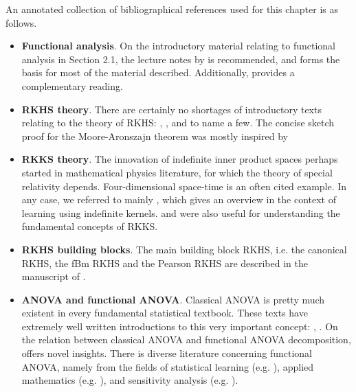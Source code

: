 \documentclass[a4paper,showframe,11pt]{report}
\begin{document}
An annotated collection of bibliographical references used for this chapter is as follows.
\begin{itemize}
  \item \textbf{Functional analysis}. On the introductory material relating to functional analysis in Section 2.1, the lecture notes by \citet{sejdinovic2012} is recommended, and forms the basis for most of the material described. Additionally, \citet{rudin1987real} provides a complementary reading.
  \item \textbf{RKHS theory}. There are certainly no shortages of introductory texts relating to the theory of RKHS: \citet{steinwart2008support}, \citet{berlinet2011reproducing}, and \citet{gu2013smoothing} to name a few. The concise sketch proof for the Moore-Aronszajn theorem was mostly inspired by \citet[Theorem 4]{hein2004kernels}
  \item \textbf{RKKS theory}. The innovation of indefinite inner product spaces perhaps started in mathematical physics literature, for which the theory of special relativity depends. Four-dimensional space-time is an often cited example. In any case, we referred to mainly \citet{ong2004learning}, which gives an overview in the context of learning using indefinite kernels. \citet{alpay1991some} and \citet{zafeiriou2012subspace} were also useful for understanding the fundamental concepts of RKKS.
  \item \textbf{RKHS building blocks}. The main building block RKHS, i.e. the canonical RKHS, the fBm RKHS and the Pearson RKHS are described in the manuscript of \citet{bergsma2017}.
  \item \textbf{ANOVA and functional ANOVA}. 
  Classical ANOVA is pretty much existent in every fundamental statistical textbook. These texts have extremely well written introductions to this very important concept: \citet[Ch. 11]{casella2002statistical}, \citet[Ch. 3]{dean1999design}. 
  On the relation between classical ANOVA and functional ANOVA decomposition, \citet{gu2013smoothing} offers novel insights. There is diverse literature concerning functional ANOVA, namely from the fields of statistical learning (e.g. \cite{wahba1990spline}), applied mathematics (e.g. \cite{kuo2010decompositions}), and sensitivity analysis (e.g. \cite{sobol2001global,durrande2013anova}). 
\end{itemize}


\hClosingStuffStandalone
\end{document}
